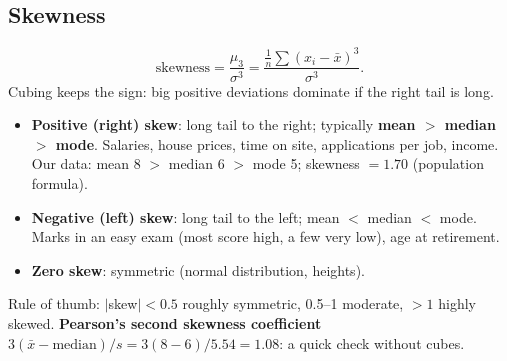 \subsection{Skewness}
\[ \text{skewness} = \frac{\mu_3}{\sigma^3} = \frac{\frac1n\sum(x_i - \bar x)^3}{\sigma^3}. \]
Cubing keeps the sign: big positive deviations dominate if the right tail is long.
\begin{center}
\end{center}
\begin{itemize}
\item \textbf{Positive (right) skew}: long tail to the right; typically \textbf{mean $>$ median $>$ mode}. Salaries, house prices, time on site, applications
  per job, income. Our data: mean 8 $>$ median 6 $>$ mode 5; skewness $= 1.70$ (population formula).
\item \textbf{Negative (left) skew}: long tail to the left; mean $<$ median $<$ mode. Marks in an easy exam (most score high, a few very low), age at retirement.
\item \textbf{Zero skew}: symmetric (normal distribution, heights).
\end{itemize}
Rule of thumb: $|$skew$| < 0.5$ roughly symmetric, 0.5--1 moderate, $>1$ highly skewed. \textbf{Pearson's second skewness coefficient}
$3(\bar x - \text{median})/s = 3(8 - 6)/5.54 = 1.08$: a quick check without cubes.

